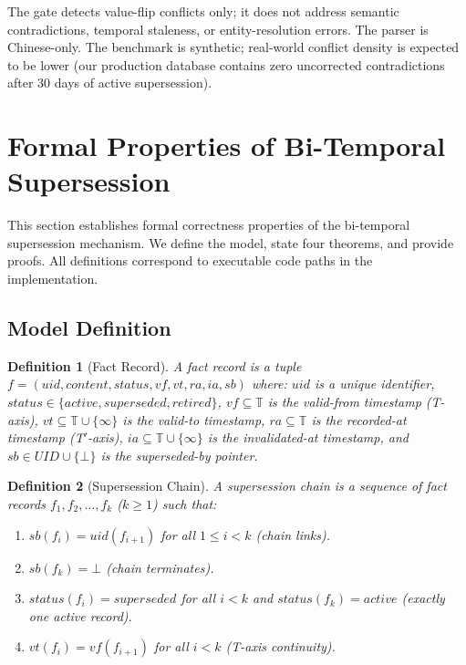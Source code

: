 \documentclass[11pt]{article}
\newtheorem{definition}{Definition}
\begin{document}
The gate detects value-flip conflicts only; it does not address semantic contradictions, temporal staleness, or entity-resolution errors. The parser is Chinese-only. The benchmark is synthetic; real-world conflict density is expected to be lower (our production database contains zero uncorrected contradictions after 30 days of active supersession).

\section{Formal Properties of Bi-Temporal Supersession}
\label{sec:formal}

This section establishes formal correctness properties of the bi-temporal supersession mechanism. We define the model, state four theorems, and provide proofs. All definitions correspond to executable code paths in the implementation.

\subsection{Model Definition}

\begin{definition}[Fact Record]
A \emph{fact record} is a tuple $f = (\mathit{uid}, \mathit{content}, \mathit{status}, \mathit{vf}, \mathit{vt}, \mathit{ra}, \mathit{ia}, \mathit{sb})$ where:
$\mathit{uid}$ is a unique identifier, $\mathit{status} \in \{\mathit{active}, \mathit{superseded}, \mathit{retired}\}$, $\mathit{vf} \subseteq \mathbb{T}$ is the \emph{valid-from} timestamp (T-axis), $\mathit{vt} \subseteq \mathbb{T} \cup \{\infty\}$ is the \emph{valid-to} timestamp, $\mathit{ra} \subseteq \mathbb{T}$ is the \emph{recorded-at} timestamp (T$'$-axis), $\mathit{ia} \subseteq \mathbb{T} \cup \{\infty\}$ is the \emph{invalidated-at} timestamp, and $\mathit{sb} \in \mathit{UID} \cup \{\bot\}$ is the \emph{superseded-by} pointer.
\end{definition}

\begin{definition}[Supersession Chain]
A \emph{supersession chain} is a sequence of fact records $f_1, f_2, \ldots, f_k$ ($k \geq 1$) such that:
\begin{enumerate}
\item $\mathit{sb}(f_i) = \mathit{uid}(f_{i+1})$ for all $1 \leq i < k$ (chain links).
\item $\mathit{sb}(f_k) = \bot$ (chain terminates).
\item $\mathit{status}(f_i) = \mathit{superseded}$ for all $i < k$ and $\mathit{status}(f_k) = \mathit{active}$ (exactly one active record).
\item $\mathit{vt}(f_i) = \mathit{vf}(f_{i+1})$ for all $i < k$ (T-axis continuity).
\end{enumerate}
\end{definition}
\end{document}
